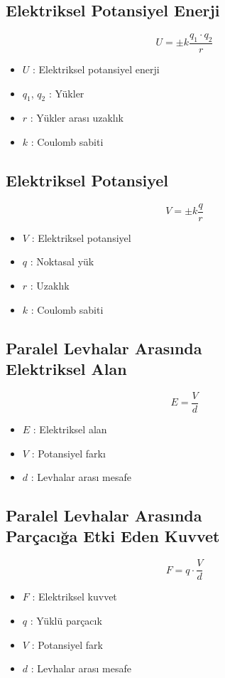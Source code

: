 \documentclass[a4paper, 11pt, titlepage]{article}
\begin{document}
\subsection{Elektriksel Potansiyel Enerji}
\[
U = \pm k \frac{q_1 \cdot q_2}{r}
\]
\begin{itemize}
  \item $U$ : Elektriksel potansiyel enerji
  \item $q_1$, $q_2$ : Yükler
  \item $r$ : Yükler arası uzaklık
  \item $k$ : Coulomb sabiti
\end{itemize}

\subsection{Elektriksel Potansiyel}
\[
V = \pm k \frac{q}{r}
\]
\begin{itemize}
  \item $V$ : Elektriksel potansiyel
  \item $q$ : Noktasal yük
  \item $r$ : Uzaklık
  \item $k$ : Coulomb sabiti
\end{itemize}

\subsection[P.L.A. Elektriksel Alan]{Paralel Levhalar Arasında \\ Elektriksel Alan}
\[
E = \frac{V}{d}
\]
\begin{itemize}
  \item $E$ : Elektriksel alan
  \item $V$ : Potansiyel farkı
  \item $d$ : Levhalar arası mesafe
\end{itemize}

\subsection[P.L.A. Parçacığa Etki Eden Kuvvet]{Paralel Levhalar Arasında \\Parçacığa Etki Eden Kuvvet}
\[
F = q\cdot \frac{V}{d}
\]
\begin{itemize}
  \item $F$ : Elektriksel kuvvet
  \item $q$ : Yüklü parçacık
  \item $V$ : Potansiyel fark
  \item $d$ : Levhalar arası mesafe
\end{itemize}
\end{document}
